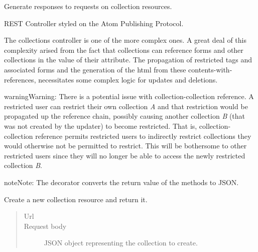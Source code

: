 \documentclass[letterpaper,10pt,english]{sphinxmanual}
\begin{document}
\begin{fulllineitems}
\label{api:onlinelinguisticdatabase.controllers.oldcollections.OldcollectionsController}
Generate responses to requests on collection resources.

REST Controller styled on the Atom Publishing Protocol.

The collections controller is one of the more complex ones.  A great deal of
this complexity arised from the fact that collections can reference forms
and other collections in the value of their  attribute.  The
propagation of restricted tags and associated forms and the generation of
the html from these contents-with-references, necessitates some complex
logic for updates and deletions.

\begin{notice}{warning}{Warning:}
There is a potential issue with collection-collection reference.  A
restricted user can restrict their own collection \emph{A} and that
restriction would be propagated up the reference chain, possibly causing
another collection \emph{B} (that was not created by the updater) to become
restricted. That is, collection-collection reference permits restricted
users to indirectly restrict collections they would otherwise not be
permitted to restrict. This will be bothersome to other restricted users
since they will no longer be able to access the newly restricted
collection \emph{B}.
\end{notice}

\begin{notice}{note}{Note:}
The  decorator converts the return value of the methods to
JSON.
\end{notice}

\begin{fulllineitems}
\label{api:onlinelinguisticdatabase.controllers.oldcollections.OldcollectionsController.create}
Create a new collection resource and return it.
\begin{quote}\begin{description}
\item[{Url }] \leavevmode
{}

\item[{Request body}] \leavevmode
JSON object representing the collection to create.


\end{description}
\end{quote}
\end{fulllineitems}
\end{fulllineitems}
\end{document}
